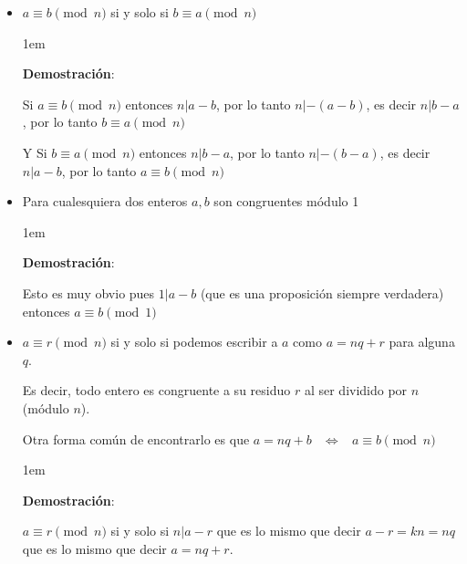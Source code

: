 \documentclass[12pt]{report}                                    %
\newenvironment{SmallIndentation}[1][0.75em]                    %
    {\begin{adjustwidth}{#1}{}\begin{footnotesize}}                 %
    {\end{footnotesize}\end{adjustwidth}}                           %
\DeclareMathOperator \Space {\quad}                             %
\DeclareMathOperator \MiniSpace {\;}                            %
\newcommand \lequal {\MiniSpace \Leftrightarrow \MiniSpace}     %
\begin{document}
            \begin{itemize}

                \item $a \equiv b \pmod{n}$ si y solo si $b \equiv a \pmod{n}$

                    \begin{SmallIndentation}[1em]
                        \textbf{Demostración}:

                        Si $a \equiv b \pmod{n}$ entonces $n | a - b$, por lo tanto
                        $n | -(a - b)$, es decir $n|b-a$, por lo tanto $b \equiv a \pmod{n}$

                        Y Si $b \equiv a \pmod{n}$ entonces $n | b - a$, por lo tanto
                        $n | -(b - a)$, es decir $n|a-b$, por lo tanto $a \equiv b \pmod{n}$

                    \end{SmallIndentation}

                \item Para cualesquiera dos enteros $a,b$ son congruentes módulo 1

                    \begin{SmallIndentation}[1em]
                        \textbf{Demostración}:

                        Esto es muy obvio pues $1|a-b$ (que es una proposición siempre
                        verdadera) entonces $a \equiv b \pmod{1}$

                    \end{SmallIndentation}

                \item $a \equiv r \pmod{n}$ si y solo si podemos escribir a $a$ como $a=nq+r$
                    para alguna $q$.

                    Es decir, todo entero es congruente a su residuo $r$ al ser dividido por $n$
                    (módulo $n$).

                    Otra forma común de encontrarlo es que
                    $a=nq+b \lequal a \equiv b \pmod{n}$ 


                    \begin{SmallIndentation}[1em]
                        \textbf{Demostración}:

                        $a \equiv r \pmod{n}$ si y solo si $n|a-r$ que es lo mismo
                        que decir $a-r = kn = nq$ que es lo mismo que decir $a=nq+r$.


\end{SmallIndentation}
\end{itemize}
\end{document}

